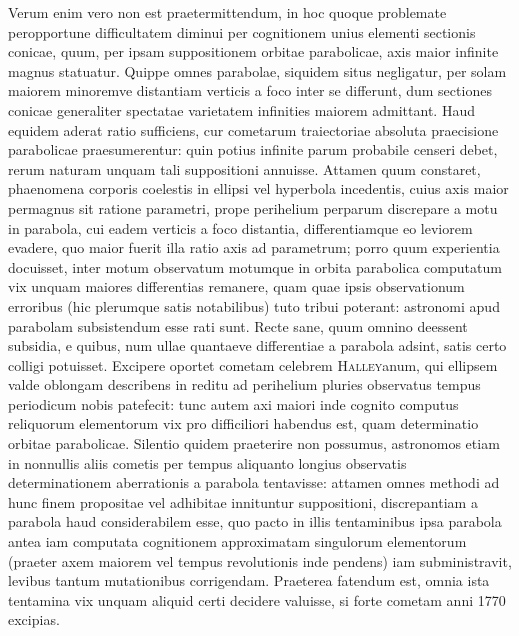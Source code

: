 Verum enim vero non est praetermittendum, in hoc quoque problemate peropportune difficultatem diminui per cognitionem unius elementi sectionis conicae, quum, per ipsam suppositionem orbitae parabolicae, axis maior infinite magnus statuatur. Quippe omnes parabolae, siquidem situs negligatur, per solam maiorem minoremve distantiam verticis a foco inter se differunt, dum sectiones conicae generaliter spectatae varietatem infinities maiorem admittant. Haud equidem aderat ratio sufficiens, cur cometarum traiectoriae absoluta praecisione parabolicae praesumerentur: quin potius infinite parum probabile censeri debet, rerum naturam unquam tali suppositioni annuisse. Attamen quum constaret, phaenomena corporis coelestis in ellipsi vel hyperbola incedentis, cuius axis maior permagnus sit ratione parametri, prope perihelium perparum discrepare a motu in parabola, cui eadem verticis a foco distantia, differentiamque eo leviorem evadere, quo maior fuerit illa ratio axis ad parametrum; porro quum experientia docuisset, inter motum observatum motumque in orbita parabolica computatum vix unquam maiores differentias remanere, quam quae ipsis observationum erroribus (hic plerumque satis notabilibus) tuto tribui poterant: astronomi apud parabolam subsistendum esse rati sunt. Recte sane, quum omnino deessent subsidia, e quibus, num ullae quantaeve differentiae a parabola adsint, satis certo colligi potuisset. Excipere oportet cometam celebrem \textsc{Halley}anum, qui ellipsem valde oblongam describens in
reditu ad perihelium pluries observatus tempus periodicum nobis patefecit: tunc autem axi maiori inde cognito computus reliquorum elementorum vix pro difficiliori habendus est, quam determinatio orbitae parabolicae. Silentio quidem praeterire non possumus, astronomos etiam in nonnullis aliis cometis per tempus aliquanto longius observatis determinationem aberrationis a parabola tentavisse: attamen omnes methodi ad hunc finem propositae vel adhibitae innituntur suppositioni, discrepantiam a parabola haud considerabilem esse, quo pacto in illis tentaminibus ipsa parabola antea iam computata cognitionem approximatam singulorum elementorum (praeter axem maiorem vel tempus revolutionis inde pendens) iam subministravit, levibus tantum mutationibus corrigendam. Praeterea fatendum est, omnia ista tentamina vix unquam aliquid certi decidere valuisse, si forte cometam anni 1770 excipias.

